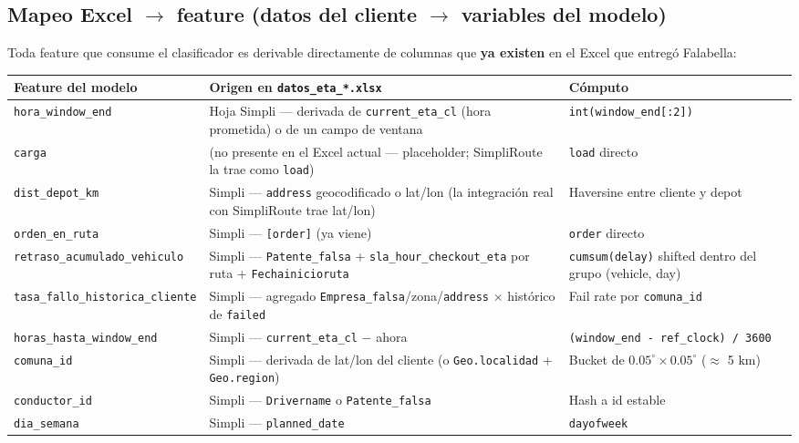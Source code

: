 \documentclass[11pt,a4paper]{article}
\begin{document}
\subsection{Mapeo Excel $\rightarrow$ feature (datos del cliente $\rightarrow$ variables del modelo)}
\label{sec:mapeo}

Toda feature que consume el clasificador es derivable directamente de columnas que \textbf{ya existen} en el Excel que entregó Falabella:

\begin{longtable}{p{3.6cm} p{6cm} p{5.2cm}}
\toprule
\textbf{Feature del modelo} & \textbf{Origen en \texttt{datos\_eta\_*.xlsx}} & \textbf{Cómputo} \\
\midrule
\endhead
\texttt{hora\_window\_end} & Hoja Simpli --- derivada de \texttt{current\_eta\_cl} (hora prometida) o de un campo de ventana & \texttt{int(window\_end[:2])} \\
\texttt{carga} & (no presente en el Excel actual --- placeholder; SimpliRoute la trae como \texttt{load}) & \texttt{load} directo \\
\texttt{dist\_depot\_km} & Simpli --- \texttt{address} geocodificado o lat/lon (la integración real con SimpliRoute trae lat/lon) & Haversine entre cliente y depot \\
\texttt{orden\_en\_ruta} & Simpli --- \texttt{[order]} (ya viene) & \texttt{order} directo \\
\texttt{retraso\_acumulado\_vehiculo} & Simpli --- \texttt{Patente\_falsa} + \texttt{sla\_hour\_checkout\_eta} por ruta + \texttt{Fechainicioruta} & \texttt{cumsum(delay)} shifted dentro del grupo (vehicle, day) \\
\texttt{tasa\_fallo\_historica\_cliente} & Simpli --- agregado \texttt{Empresa\_falsa}/zona/\texttt{address} $\times$ histórico de \texttt{failed} & Fail rate por \texttt{comuna\_id} \\
\texttt{horas\_hasta\_window\_end} & Simpli --- \texttt{current\_eta\_cl} $-$ ahora & \texttt{(window\_end - ref\_clock) / 3600} \\
\texttt{comuna\_id} & Simpli --- derivada de lat/lon del cliente (o \texttt{Geo.localidad} + \texttt{Geo.region}) & Bucket de $0.05^{\circ} \times 0.05^{\circ}$ ($\approx$ 5 km) \\
\texttt{conductor\_id} & Simpli --- \texttt{Drivername} o \texttt{Patente\_falsa} & Hash a id estable \\
\texttt{dia\_semana} & Simpli --- \texttt{planned\_date} & \texttt{dayofweek} \\
\bottomrule
\end{longtable}
\end{document}
